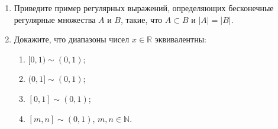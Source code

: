 \begin{enumerate}
    \item Приведите пример регулярных выражений, определяющих бесконечные регулярные множества $A$ и $B$, такие, что $A\subset B$ и $|A|=|B|$.
    
    \item Докажите, что диапазоны чисел $x\in\mathbb{R}$ эквивалентны:
    \begin{enumerate}
        \item $[0,1)\sim(0,1)$;
        \item $(0,1]\sim(0,1)$;
        \item $[0,1]\sim(0,1)$;
        \item $[m,n]\sim(0,1)$, $m,n\in\mathbb{N}$.        
    \end{enumerate}
    
\end{enumerate}
